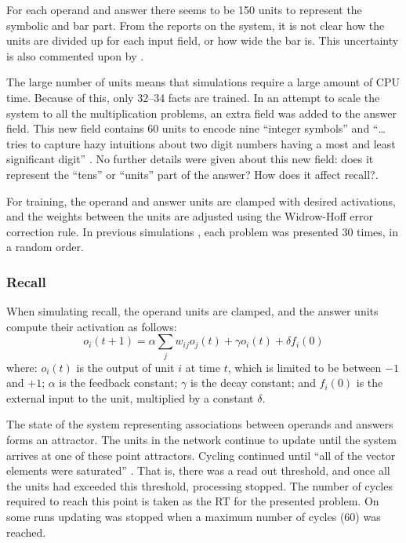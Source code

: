 For each operand and answer there seems to be 150 units to
represent the symbolic and bar part.  From the reports on the system, it is
not clear how the units are divided up for each input field, or how wide
the bar is. This uncertainty is also commented upon by .

The large number of units means that simulations require a large amount of
CPU time. Because of this, only 32--34 facts are trained.
In an attempt to scale the system to all the multiplication problems,
an extra field was added to the answer field.  This new field contains 60
units to encode nine ``integer symbols'' and ``\ldots tries to capture hazy
intuitions about two digit numbers having a most and least significant
digit'' \cite[p.~7]{andestud}.  No further details were given about this
new field: does it represent the ``tens'' or ``units'' part of the
answer? How does it affect recall?.

For training, the operand and answer units are clamped with desired
activations, and the weights between the units are adjusted using the
Widrow-Hoff error correction rule.  In previous simulations
\cite{viscrepr}, each problem was presented 30 times, in a random order.

\subsubsection{Recall}

When simulating recall, the operand units are clamped, and the answer units
compute their activation as follows:
$$
o_i(t+1)= \alpha \sum\limits_j w_{ij}o_j(t) + \gamma o_i(t) + \delta f_i(0)
$$
\noindent where: $o_i(t)$ is the output of unit $i$ at time $t$, which is
limited to be between $-1$ and $+1$; $\alpha$ is the feedback constant;
$\gamma$ is the decay constant; and $f_i(0)$ is the external input to the
unit, multiplied by a constant $\delta$.

The state of the system representing associations between operands and
answers forms an attractor.  The units in the network continue to update
until the system arrives at one of these point attractors. Cycling
continued until ``all of the vector elements were saturated''
\cite[p.~150]{viscrepr}.  That is, there was a read out threshold, and once
all the units had exceeded this threshold, processing stopped. The number of
cycles required to reach this point is taken as the RT for the presented
problem.  On some runs updating was stopped
when a maximum number of cycles (60) was reached.

